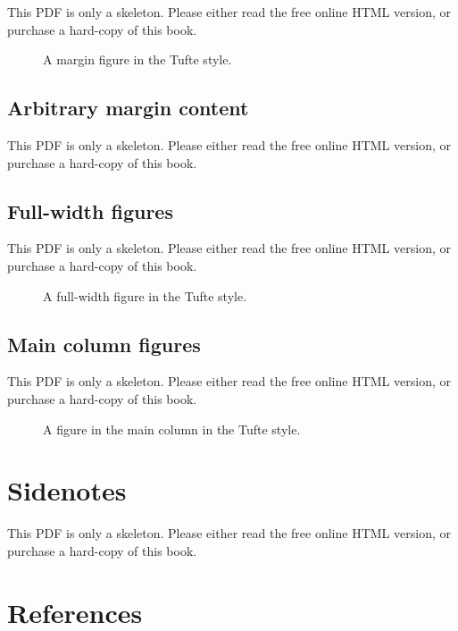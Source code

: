 \documentclass[
  11pt,
]{krantz}
\theoremstyle{definition}
\theoremstyle{definition}
\theoremstyle{definition}
\theoremstyle{definition}
\theoremstyle{remark}
\begin{document}
This PDF is only a skeleton. Please either read the free online HTML version, or purchase a hard-copy of this book.

\begin{figure}\caption{A margin figure in the Tufte style.}\end{figure}

\subsection{Arbitrary margin content}\label{arbitrary-margin-content}

This PDF is only a skeleton. Please either read the free online HTML version, or purchase a hard-copy of this book.

\subsection{Full-width figures}\label{full-width-figures}

This PDF is only a skeleton. Please either read the free online HTML version, or purchase a hard-copy of this book.

\begin{figure}\caption{A full-width figure in the Tufte style.}\end{figure}

\subsection{Main column figures}\label{main-column-figures}

This PDF is only a skeleton. Please either read the free online HTML version, or purchase a hard-copy of this book.

\begin{figure}\caption{A figure in the main column in the Tufte style.}\end{figure}

\section{Sidenotes}\label{tufte-sidenotes}

This PDF is only a skeleton. Please either read the free online HTML version, or purchase a hard-copy of this book.

\section{References}\label{tufte-references}
\end{document}

